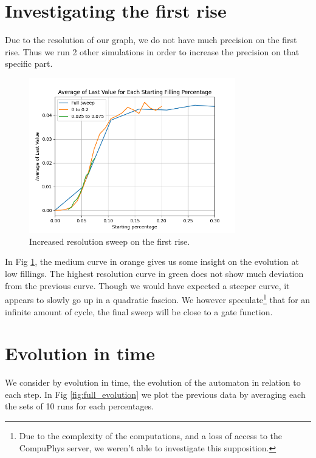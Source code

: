 \documentclass{article}
\begin{document}
\section{Investigating the first rise}
Due to the resolution of our graph, we do not have much precision on the first rise. Thus
we run 2 other simulations in order to increase the precision on that specific part.


\begin{figure}[htbp]
    \centering
    \includegraphics[width=0.8\textwidth]{res/sweep_zoom.png}
    \caption{Increased resolution sweep on the first rise.}
    \label{fig:sweep_zoom}
\end{figure}


In Fig \ref*{fig:sweep_zoom}, the medium curve in orange gives us some insight on the evolution
at low fillings. The highest resolution curve in green does not show much deviation
from the previous curve. Though we would have expected a steeper curve, it appears to slowly go up
in a quadratic fascion. We however speculate\footnote[1]{Due to the complexity of the computations, and a loss of access
to the CompuPhys server, we weren't able to investigate this supposition.} that for an infinite amount of cycle, the final sweep will be 
close to a gate function. 



\section{Evolution in time}
We consider by evolution in time, the evolution of the automaton in relation to each step.
In Fig \ref*{fig:full_evolution} we plot the previous data by averaging each the sets of 
10 runs for each percentages.
\end{document}
